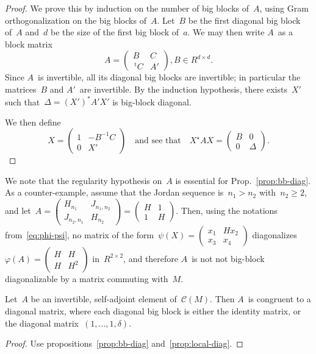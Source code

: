 \documentclass{lms}%
\let\ro\mathscr
\def\transpose{\,{}^{\mathrm{t}\!}}
\def\mat#1{\begin{pmatrix}#1\end{pmatrix}}
\begin{document}
\begin{proof}
We prove this by induction on the number of big blocks of~$A$, using Gram
orthogonalization on the big blocks of~$A$. Let~$B$ be the first diagonal
big block of~$A$ and~$d$ be the size of the first big block of~$a$.
We may then write $A$~as a block matrix
\begin{equation}
A = \mat{B & C \\ \transpose{C} & A'}, B ∈ R^{d×d}.
\end{equation}
Since $A$~is invertible, all its diagonal big blocks are invertible; in
particular the matrices~$B$ and $A'$~are invertible. By the induction
hypothesis, there exists~$X'$ such that~$Δ = (X')^{*} A' X'$ is
big-block diagonal.

We then define
\begin{equation}
X = \mat{1 & -B^{-1} C\\0 & X'}\quad\text{and see that}\quad
X^{⋆} A X = \mat{B & 0\\0 & Δ}.
\end{equation}
\end{proof}

We note that the regularity hypothesis on~$A$ is essential for
Prop.~\ref{prop:bb-diag}. As a counter-example, assume that the Jordan
sequence is~$n_1 > n_2$ with~$n_2 ≥ 2$, and let~$A = \mat{H_{n_1} &
J_{n_1,n_2} \\ J_{n_2,n_1} & H_{n_2}} = \mat{H&1\\1&H}$.
Then, using the notations from~\eqref{eq:phi-psi}, no matrix of the
form~$ψ(X) = \mat{x_1&H x_2\\x_3&x_4}$ diagonalizes~$φ(A) =
\mat{H&H\\H&H^2}$ in~$R^{2×2}$, and therefore $A$~is not not big-block
diagonalizable by a matrix commuting with~$M$.
\begin{prop}\label{prop:diag}%
Let~$A$ be an invertible, self-adjoint element of~$\ro C(M)$. Then $A$~is
congruent to a diagonal matrix, where each diagonal big block is either
the identity matrix, or the diagonal matrix~$(1, …, 1, δ)$.
\end{prop}

\begin{proof}
Use propositions~\ref{prop:bb-diag} and~\ref{prop:local-diag}.
\end{proof}%
\end{document}
